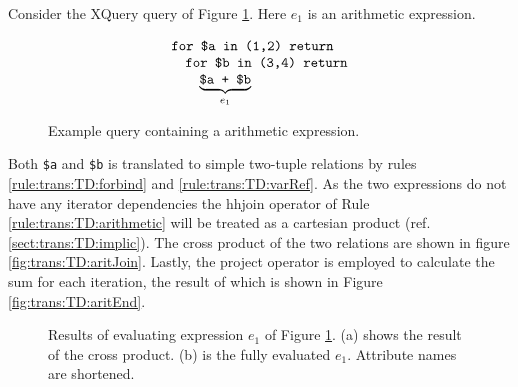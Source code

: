 \begin{myExample}
Consider the XQuery query of Figure \ref{fig:trans:TD:arithQuery}. Here $e_1$ is an arithmetic expression.

\begin{figure}[h]
\centering
\begin{equation*}
\begin{array}{l}
\mbox{\texttt{for \$a in (1,2) return}} \\ \quad
\mbox{\texttt{for \$b in (3,4) return}} \\ \quad \quad
\underbrace{\mbox{\texttt{\$a + \$b}}}_{e_1}
\end{array}
\end{equation*}
\caption{Example query containing a arithmetic expression.}
\label{fig:trans:TD:arithQuery}
\end{figure}

Both \texttt{\$a} and \texttt{\$b} is translated to simple two-tuple relations by rules
\ref{rule:trans:TD:forbind} and \ref{rule:trans:TD:varRef}. As the two expressions do not have any iterator
dependencies the \textsf{hhjoin} operator of Rule \ref{rule:trans:TD:arithmetic}
will be treated as a cartesian product (ref. \ref{sect:trans:TD:implic}). The cross product of the two relations are shown in figure
\ref{fig:trans:TD:aritJoin}. Lastly, the \textsf{project} operator is employed
to calculate the sum for each iteration, the result of which is shown in Figure \ref{fig:trans:TD:aritEnd}.

\begin{figure}[h]
\centering
{}
\qquad
{}
\caption[Results of evaluating expression $e_1$ of Figure \ref{fig:trans:TD:arithQuery}.]{Results of evaluating
expression $e_1$ of Figure \ref{fig:trans:TD:arithQuery}. (a) shows the result of the cross product. (b) is the
fully evaluated $e_1$. Attribute names are shortened. \label{fig:trans:TD:arithRes}}
\end{figure}

\end{myExample}

